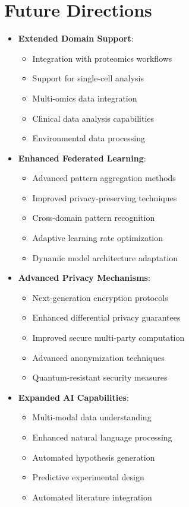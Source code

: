 \documentclass[11pt,a4paper]{article}
\begin{document}
\section{Future Directions}
\begin{itemize}
    \item \textbf{Extended Domain Support}:
    \begin{itemize}
        \item Integration with proteomics workflows
        \item Support for single-cell analysis
        \item Multi-omics data integration
        \item Clinical data analysis capabilities
        \item Environmental data processing
    \end{itemize}
    
    \item \textbf{Enhanced Federated Learning}:
    \begin{itemize}
        \item Advanced pattern aggregation methods
        \item Improved privacy-preserving techniques
        \item Cross-domain pattern recognition
        \item Adaptive learning rate optimization
        \item Dynamic model architecture adaptation
    \end{itemize}
    
    \item \textbf{Advanced Privacy Mechanisms}:
    \begin{itemize}
        \item Next-generation encryption protocols
        \item Enhanced differential privacy guarantees
        \item Improved secure multi-party computation
        \item Advanced anonymization techniques
        \item Quantum-resistant security measures
    \end{itemize}
    
    \item \textbf{Expanded AI Capabilities}:
    \begin{itemize}
        \item Multi-modal data understanding
        \item Enhanced natural language processing
        \item Automated hypothesis generation
        \item Predictive experimental design
        \item Automated literature integration
    \end{itemize}
\end{itemize}
\end{document}
